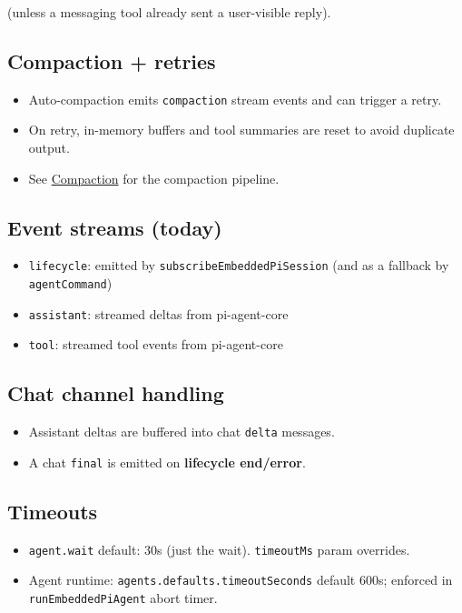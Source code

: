 (unless a messaging tool already sent a user-visible reply).

\subsection{Compaction + retries}


\begin{itemize}
  \item Auto-compaction emits \texttt{compaction} stream events and can trigger a retry.
  \item On retry, in-memory buffers and tool summaries are reset to avoid duplicate output.
  \item See \href{/concepts/compaction}{Compaction} for the compaction pipeline.
\end{itemize}


\subsection{Event streams (today)}


\begin{itemize}
  \item \texttt{lifecycle}: emitted by \texttt{subscribeEmbeddedPiSession} (and as a fallback by \texttt{agentCommand})
  \item \texttt{assistant}: streamed deltas from pi-agent-core
  \item \texttt{tool}: streamed tool events from pi-agent-core
\end{itemize}


\subsection{Chat channel handling}


\begin{itemize}
  \item Assistant deltas are buffered into chat \texttt{delta} messages.
  \item A chat \texttt{final} is emitted on \textbf{lifecycle end/error}.
\end{itemize}


\subsection{Timeouts}


\begin{itemize}
  \item \texttt{agent.wait} default: 30s (just the wait). \texttt{timeoutMs} param overrides.
  \item Agent runtime: \texttt{agents.defaults.timeoutSeconds} default 600s; enforced in \texttt{runEmbeddedPiAgent} abort timer.
\end{itemize}


